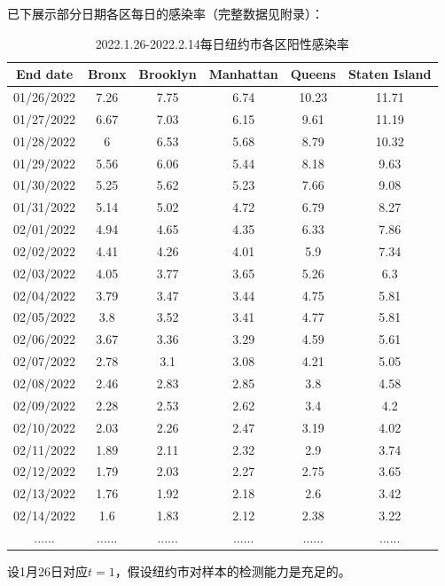 \documentclass[withoutpreface,bwprint]{cumcmthesis} %
\begin{document}
已下展示部分日期各区每日的感染率（完整数据见附录）：
\begin{table}[H]
\centering
\begin{tabular}{cccccc}
\toprule
End date   & Bronx & Brooklyn & Manhattan & Queens & Staten Island \\ 
\midrule
01/26/2022 & 7.26  & 7.75     & 6.74      & 10.23  & 11.71         \\
01/27/2022 & 6.67  & 7.03     & 6.15      & 9.61   & 11.19         \\
01/28/2022 & 6     & 6.53     & 5.68      & 8.79   & 10.32         \\
01/29/2022 & 5.56  & 6.06     & 5.44      & 8.18   & 9.63          \\
01/30/2022 & 5.25  & 5.62     & 5.23      & 7.66   & 9.08          \\
01/31/2022 & 5.14  & 5.02     & 4.72      & 6.79   & 8.27          \\
02/01/2022 & 4.94  & 4.65     & 4.35      & 6.33   & 7.86          \\
02/02/2022 & 4.41  & 4.26     & 4.01      & 5.9    & 7.34          \\
02/03/2022 & 4.05  & 3.77     & 3.65      & 5.26   & 6.3           \\
02/04/2022 & 3.79  & 3.47     & 3.44      & 4.75   & 5.81          \\
02/05/2022 & 3.8   & 3.52     & 3.41      & 4.77   & 5.81          \\
02/06/2022 & 3.67  & 3.36     & 3.29      & 4.59   & 5.61          \\
02/07/2022 & 2.78  & 3.1      & 3.08      & 4.21   & 5.05          \\
02/08/2022 & 2.46  & 2.83     & 2.85      & 3.8    & 4.58          \\
02/09/2022 & 2.28  & 2.53     & 2.62      & 3.4    & 4.2           \\
02/10/2022 & 2.03  & 2.26     & 2.47      & 3.19   & 4.02          \\
02/11/2022 & 1.89  & 2.11     & 2.32      & 2.9    & 3.74          \\
02/12/2022 & 1.79  & 2.03     & 2.27      & 2.75   & 3.65          \\
02/13/2022 & 1.76  & 1.92     & 2.18      & 2.6    & 3.42          \\
02/14/2022 & 1.6   & 1.83     & 2.12      & 2.38   & 3.22          \\ 
......     & ...... &...... &...... &...... &...... \\
\bottomrule
\end{tabular}
\caption{2022.1.26-2022.2.14每日纽约市各区阳性感染率}
\end{table}
设1月26日对应$t=1$，假设纽约市对样本的检测能力是充足的。
\end{document}
